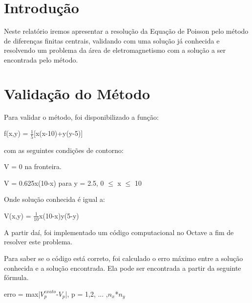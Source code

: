 \documentclass[
12pt,				%
oneside,			%
a4paper,			%
english,			%
french,				%
spanish,			%
brazil				%
]{abntex2}
\begin{document}


\tableofcontents*
\cleardoublepage
{}	%



\textual



\chapter{Introdução}

Neste relatório iremos apresentar a resolução da Equação de Poisson pelo método de diferenças finitas centrais, validando com uma solução já conhecida e resolvendo um problema da área de eletromagnetismo com a solução a ser encontrada pelo método.

\chapter{Validação do Método}

Para validar o método, foi disponibilizado a função:

\begin{center}f(x,y) = $\frac{1}{5}$[x(x-10)+y(y-5)]\end{center}

com as seguintes condições de contorno:
\begin{center}
V = 0 na fronteira. 

V = 0.625x(10-x) para  y = 2.5,  0 $\leq $ x $\leq $  10 
\end{center}

Onde solução conhecida é igual a:

\begin{center}

V(x,y) = $\frac{1}{10}$x(10-x)y(5-y)
\end{center} 

A partir daí, foi implementado um código computacional no Octave a fim de resolver este problema.

Para saber se o código está correto, foi calculado o erro máximo entre a solução conhecida e a solução encontrada. Ela pode ser encontrada a partir da seguinte fórmula.
\begin{center} erro = max|$V_p^{exato}$-$V_p$|, p = 1,2, ... ,$n_x$*$n_y$\end{center}
\end{document}
